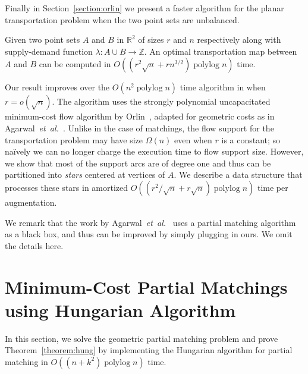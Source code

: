 \documentclass[a4paper,UKenglish]{socg-lipics-v2018}
\def\etal{\emph{et~al.}}
\def\etal{\textit{et~al.}}
\def\polylog{\mathop{\mathrm{polylog}}}
\def\reals{\mathbb{R}}
\def\ints{\mathbb{Z}}
\def\tsupply{\lambda}
\theoremstyle{plain}
\numberwithin{figure}{section}
\begin{document}
\medskip

Finally in Section~\ref{section:orlin} we present a faster algorithm for the
planar transportation problem when the two point sets are unbalanced.

\begin{theorem}
\label{theorem:orlin}
Given two point sets $A$ and $B$ in $\reals^2$ of sizes $r$ and $n$ respectively
along with supply-demand function $\tsupply:A \cup B \to \ints$.
An optimal transportation map between $A$ and $B$ can be computed in
$O((r^2\sqrt{n} + rn^{3/2})\polylog n)$ time.
\end{theorem}

Our result improves over the $O(n^2\polylog n)$ time algorithm in
\cite{AFPVX17} when $r = o(\sqrt{n})$.
The algorithm uses the strongly polynomial uncapacitated minimum-cost
flow algorithm by Orlin~\cite{O93}, adapted for geometric costs as in
Agarwal~\etal~\cite{AFPVX17}.
Unlike in the case of matchings, the flow support for the transportation problem may have size $\Omega(n)$
even when $r$ is a constant; so na\"ively we can no longer charge the execution time to flow support size.
However, we show that most of the support arcs are of degree one and thus can be partitioned
into \emph{stars} centered at vertices of $A$.
We describe a data structure that processes these stars in amortized
$O((r^2/\sqrt{n} + r\sqrt{n})\polylog n)$ time per augmentation.

We remark that the work by Agarwal~\etal~\cite{AKKMRSX18} uses a partial matching
algorithm as a black box, and thus can be improved by simply plugging in ours.
We omit the details here.

\section{Minimum-Cost Partial Matchings using Hungarian Algorithm}
\label{section:hung}

In this section, we solve the geometric partial matching problem and prove Theorem~\ref{theorem:hung} by implementing the Hungarian algorithm for partial matching in $O((n + k^2)\polylog n)$ time.
\end{document}
